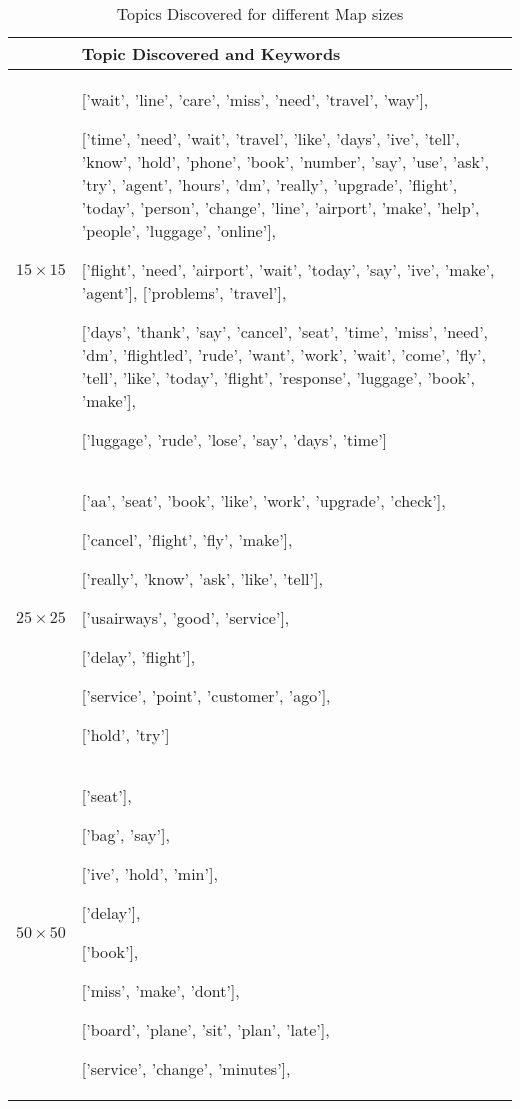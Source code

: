 \documentclass{article}
\begin{document}
\begin{table}[htbp]
\caption[title of table]{Topics Discovered for different Map sizes} \label{Tab-SOMSizes}
\centering

\begin{tabular}{|p{1.5cm}|p{10cm}| } %
	\hline
	&   \bf Topic Discovered and Keywords  \\ 
	\hline %
	
	$15 \times 15 $ & ['wait', 'line', 'care', 'miss', 'need', 'travel', 'way'],
	
	['time', 'need', 'wait', 'travel', 'like', 'days', 'ive', 'tell', 'know', 'hold', 'phone', 'book', 'number', 'say', 'use', 'ask', 'try', 'agent', 'hours', 'dm', 'really', 'upgrade', 'flight', 'today', 'person', 'change', 'line', 'airport', 'make', 'help', 'people', 'luggage', 'online'],
	
	['flight', 'need', 'airport', 'wait', 'today', 'say', 'ive', 'make', 'agent'], 
	['problems', 'travel'], 
	
	['days', 'thank', 'say', 'cancel', 'seat', 'time', 'miss', 'need', 'dm', 'flightled', 'rude', 'want', 'work', 'wait', 'come', 'fly', 'tell', 'like', 'today', 'flight', 'response', 'luggage', 'book', 'make'], 
	
	['luggage', 'rude', 'lose', 'say', 'days', 'time']  \\
	\hline
	$25 \times 25 $&  ['aa', 'seat', 'book', 'like', 'work', 'upgrade', 'check'],
	
	['cancel', 'flight', 'fly', 'make'],
	
	['really', 'know', 'ask', 'like', 'tell'],
	
	['usairways', 'good', 'service'], 
	
	['delay', 'flight'], 
	
	['service', 'point', 'customer', 'ago'],
	
	['hold', 'try']   \\
	\hline
	$50 \times 50 $& ['seat'],
	 
	['bag', 'say'], 
	
	['ive', 'hold', 'min'], 
	
	['delay'], 
	
	['book'], 
	
	['miss', 'make', 'dont'], 
	
	['board', 'plane', 'sit', 'plan', 'late'], 
	
	['service', 'change', 'minutes'], 
	

\end{tabular}
\end{table}
\end{document}
